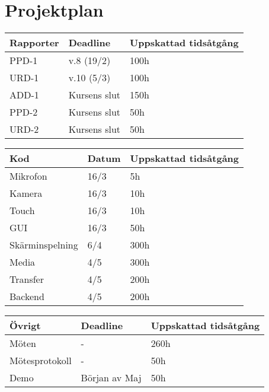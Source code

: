 
\section{Projektplan}


\begin{center}
    \begin{tabular}{ | l | l | l |}
    \hline
    Rapporter & Deadline & Uppskattad tidsåtgång \\ \hline
    PPD-1 & v.8 (19/2) & 100h \\ \hline
    URD-1 & v.10 (5/3) & 100h \\ \hline
    ADD-1 & Kursens slut & 150h \\ \hline
    PPD-2 & Kursens slut & 50h \\ \hline
    URD-2 & Kursens slut & 50h \\ \hline
    \end{tabular}
\end{center}

\begin{center}
    \begin{tabular}{ | l | l | l |}
    \hline
    Kod & Datum & Uppskattad tidsåtgång \\ \hline
    Mikrofon & 16/3 & 5h \\ \hline
    Kamera & 16/3 & 10h  \\ \hline
    Touch & 16/3 & 10h \\ \hline
    GUI & 16/3 & 50h \\ \hline
    Skärminspelning & 6/4 & 300h \\ \hline
    Media & 4/5 & 300h \\ \hline
    Transfer & 4/5 & 200h \\ \hline
    Backend & 4/5 & 200h \\ \hline
    \end{tabular}
\end{center}

\begin{center}
    \begin{tabular}{ | l | l | l | }
    \hline
    Övrigt & Deadline & Uppskattad tidsåtgång \\ \hline
    Möten & - & 260h \\ \hline
    Mötesprotokoll & - & 50h \\ \hline
    Demo & Början av Maj & 50h \\ \hline
    \end{tabular}
\end{center}

